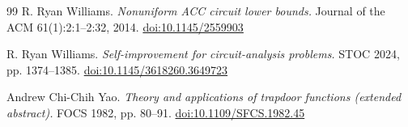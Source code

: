 \documentclass[11pt,letterpaper]{article}
\theoremstyle{definition}
\theoremstyle{remark}
\begin{document}
\begin{thebibliography}{99}
 R. Ryan Williams. \emph{Nonuniform ACC circuit lower
bounds.} Journal of the ACM 61(1):2:1--2:32, 2014.
\href{https://doi.org/10.1145/2559903}{doi:10.1145/2559903}

 R. Ryan Williams. \emph{Self-improvement for
circuit-analysis problems.} STOC 2024, pp. 1374--1385.
\href{https://doi.org/10.1145/3618260.3649723}{doi:10.1145/3618260.3649723}

 Andrew Chi-Chih Yao. \emph{Theory and applications of
trapdoor functions (extended abstract).} FOCS 1982, pp. 80--91.
\href{https://doi.org/10.1109/SFCS.1982.45}{doi:10.1109/SFCS.1982.45}

\end{thebibliography}
\end{document}
